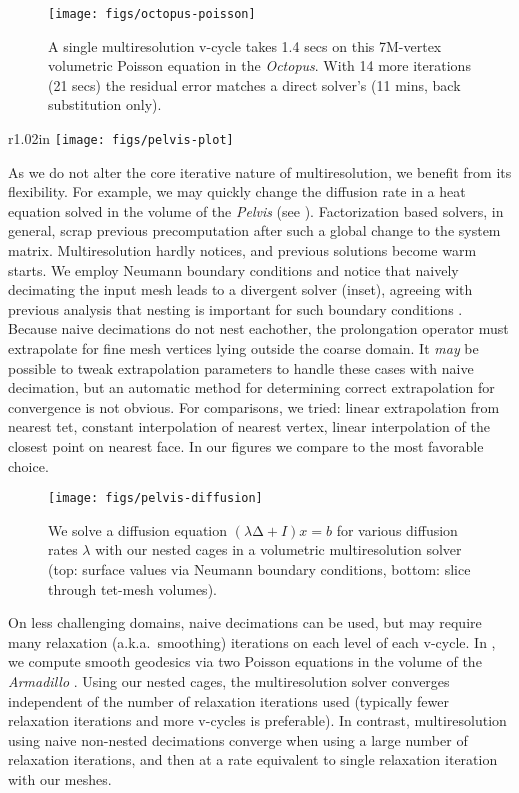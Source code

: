 \begin{figure}
  \texttt{[image: figs/octopus-poisson]}
  \caption{A single multiresolution v-cycle takes 1.4 secs on this 7M-vertex
  volumetric Poisson equation in the \emph{Octopus}. With 14 more iterations
  (21 secs) the residual error matches a direct solver's (11 mins, back
  substitution only).}
  \label{fig:octopus-poisson}
\end{figure}

\begin{wrapfigure}{r}{1.02in}
%
\centering
%
\texttt{[image: figs/pelvis-plot]}
%
\end{wrapfigure}
%
As we do not alter the core iterative nature of multiresolution, we benefit
from its flexibility. For example, we may quickly change the diffusion rate in
a heat equation solved in the volume of the \emph{Pelvis} (see
). 
%
Factorization based solvers, in general, scrap previous precomputation after
such a global change to the system matrix. 
%
Multiresolution hardly notices, and previous solutions become warm starts.
%
We employ Neumann boundary conditions and notice that naively decimating the
input mesh leads to a divergent solver (inset), agreeing with previous analysis
that nesting is important for such boundary conditions \cite{chan1999boundary}.
%
Because naive decimations do not nest eachother, the prolongation operator must
extrapolate for fine mesh vertices lying outside the coarse domain.
%
It \emph{may} be
possible to tweak extrapolation parameters to handle these cases with naive
decimation, but an automatic method for determining correct extrapolation for
convergence is not obvious.
%
For comparisons, we tried: linear extrapolation from nearest tet, constant
interpolation of nearest vertex, linear interpolation of the closest point on
nearest face. In our figures we compare to the most favorable choice.

\begin{figure}
  \texttt{[image: figs/pelvis-diffusion]}
  \caption{We solve a diffusion equation $(λ∆+I) x = b$ for various diffusion
  rates $λ$ with our nested cages in a volumetric multiresolution solver (top:
  surface values via Neumann boundary conditions, bottom: slice through
  tet-mesh volumes).}
  \label{fig:pelvis-diffusion}
\end{figure}

On less challenging domains, naive decimations can be used, but may require
many relaxation (a.k.a.\ smoothing) iterations on each level of each v-cycle.
%
In , we compute smooth geodesics via two Poisson
equations in the volume of the \emph{Armadillo} \cite{Crane:2013:RFV}.
%
Using our nested cages, the multiresolution solver converges independent of the
number of relaxation iterations used (typically fewer relaxation iterations and
more v-cycles is preferable).
%
In contrast, multiresolution using naive non-nested decimations converge when
using a large number of relaxation iterations, and then at a rate equivalent to
single relaxation iteration with our meshes.

